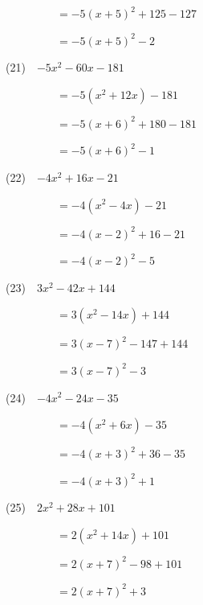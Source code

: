 \documentclass[a4j,twocolumn,10pt,fleqn]{jarticle}
\begin{document}
~~~~~~~~~$=-5(x +5)^2 +125-127$

~~~~~~~~~$=-5(x +5)^2-2$

(21)~~$-5x^2-60x-181$

~~~~~~~~~$=-5(x^2 +12x)-181$

~~~~~~~~~$=-5(x +6)^2 +180-181$

~~~~~~~~~$=-5(x +6)^2-1$

(22)~~$-4x^2 +16x-21$

~~~~~~~~~$=-4(x^2-4x)-21$

~~~~~~~~~$=-4(x-2)^2 +16-21$

~~~~~~~~~$=-4(x-2)^2-5$

(23)~~$3x^2-42x +144$

~~~~~~~~~$=3(x^2-14x) +144$

~~~~~~~~~$=3(x-7)^2-147+144$

~~~~~~~~~$=3(x-7)^2-3$

(24)~~$-4x^2-24x-35$

~~~~~~~~~$=-4(x^2 +6x)-35$

~~~~~~~~~$=-4(x +3)^2 +36-35$

~~~~~~~~~$=-4(x +3)^2 +1$

(25)~~$2x^2 +28x +101$

~~~~~~~~~$=2(x^2 +14x) +101$

~~~~~~~~~$=2(x +7)^2-98+101$

~~~~~~~~~$=2(x +7)^2 +3$
\end{document}
